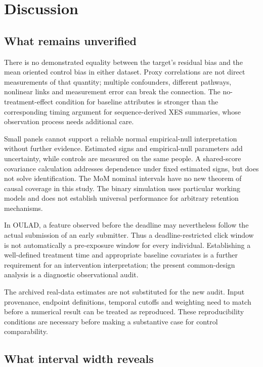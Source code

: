 \section{Discussion}
\subsection{What remains unverified}

There is no demonstrated equality between the target's residual bias and the mean oriented control bias in either dataset. Proxy correlations are not direct measurements of that quantity; multiple confounders, different pathways, nonlinear links and measurement error can break the connection. The no-treatment-effect condition for baseline attributes is stronger than the corresponding timing argument for sequence-derived XES summaries, whose observation process needs additional care.

Small panels cannot support a reliable normal empirical-null interpretation without further evidence. Estimated signs and empirical-null parameters add uncertainty, while controls are measured on the same people. A shared-score covariance calculation addresses dependence under fixed estimated signs, but does not solve identification. The MoM nominal intervals have no new theorem of causal coverage in this study. The binary simulation uses particular working models and does not establish universal performance for arbitrary retention mechanisms.

In OULAD, a feature observed before the deadline may nevertheless follow the actual submission of an early submitter. Thus a deadline-restricted click window is not automatically a pre-exposure window for every individual. Establishing a well-defined treatment time and appropriate baseline covariates is a further requirement for an intervention interpretation; the present common-design analysis is a diagnostic observational audit.

The archived real-data estimates are not substituted for the new audit. Input provenance, endpoint definitions, temporal cutoffs and weighting need to match before a numerical result can be treated as reproduced. These reproducibility conditions are necessary before making a substantive case for control comparability.

\subsection{What interval width reveals}

